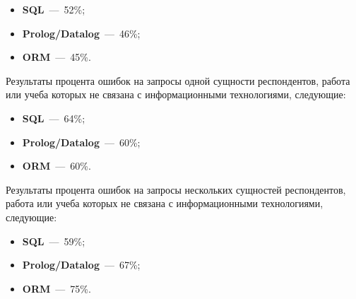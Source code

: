 \begin{itemize}
	\item \textbf{SQL}~---~52\%;
	\item \textbf{Prolog/Datalog}~---~46\%;
	\item \textbf{ORM}~---~45\%.
\end{itemize}

Результаты процента ошибок на запросы одной сущности респондентов, работа или учеба которых не связана с информационными технологиями, следующие:

\begin{itemize}
	\item \textbf{SQL}~---~64\%;
	\item \textbf{Prolog/Datalog}~---~60\%;
	\item \textbf{ORM}~---~60\%.
\end{itemize}

Результаты процента ошибок на запросы нескольких сущностей респондентов, работа или учеба которых не связана с информационными технологиями, следующие:

\begin{itemize}
	\item \textbf{SQL}~---~59\%;
	\item \textbf{Prolog/Datalog}~---~67\%;
	\item \textbf{ORM}~---~75\%.
\end{itemize}

